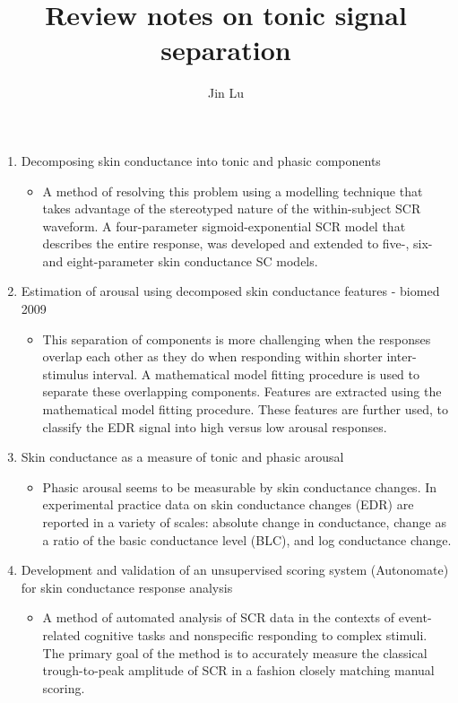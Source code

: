 \documentclass[]{article}
\title{Review notes on tonic signal separation}
\author{Jin Lu}
\begin{document}
\maketitle

\begin{enumerate}
  \item Decomposing skin conductance into tonic and phasic components~\cite{lim1997decomposing}
  \begin{itemize}
    \item A method of resolving this problem using a modelling technique that takes advantage of the stereotyped nature of the within-subject SCR waveform. A four-parameter sigmoid-exponential SCR model that describes the entire response, was developed and extended to five-, six- and eight-parameter skin conductance SC models.
  \end{itemize}
  \item Estimation of arousal using decomposed skin conductance features - biomed 2009~\cite{vartak2009estimation}
  \begin{itemize}
    \item This separation of components is more challenging when the responses overlap each other as they do when responding within shorter inter-stimulus interval. A mathematical model fitting procedure is used to separate these overlapping components. Features are extracted using the mathematical model fitting procedure. These features are further used, to classify the EDR signal into high versus low arousal responses.
  \end{itemize}
  \item Skin conductance as a measure of tonic and phasic arousal~\cite{van1967skin}
  \begin{itemize}
    \item Phasic arousal seems to be measurable by skin conductance changes. In experimental practice data on skin conductance changes (EDR) are reported in a variety of scales: absolute change in conductance, change as a ratio of the basic conductance level (BLC), and log conductance change.
  \end{itemize}
  \item Development and validation of an unsupervised scoring system (Autonomate) for skin conductance response analysis~\cite{green2014development}
  \begin{itemize}
    \item A method of automated analysis of SCR data in the contexts of event-related cognitive tasks and nonspecific responding to complex stimuli. The primary goal of the method is to accurately measure the classical trough-to-peak amplitude of SCR in a fashion closely matching manual scoring. 

\end{itemize}
\end{enumerate}
\end{document}
